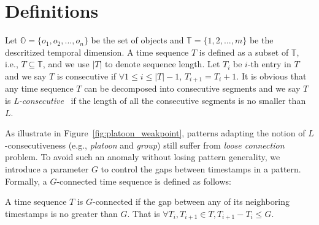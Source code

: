 \section{Definitions}
\label{sec:definition}
Let $\mathbb{O} = \{o_1 ,o_2,...,o_n\}$ be the set of objects and $\mathbb{T} =\{1,2,...,m\}$ be the descritized temporal dimension. A time sequence $T$ is defined as a subset of $\mathbb{T}$, i.e., $T \subseteq \mathbb{T}$, and we use $|T|$ to denote sequence length. Let $T_i$ be $i$-th entry in $T$ and we say $T$ is consecutive if $\forall 1\leq i\leq |T|-1$, $T_{i+1} = T_i + 1$. It is obvious that any time sequence $T$ can be decomposed into consecutive segments and we say $T$ is \textit{L-consecutive}~\cite{li2015platoon} if the length of all the consecutive segments is no smaller than $L$. 

As illustrate in Figure~\ref{fig:platoon_weakpoint}, patterns adapting the notion of $L$-consecutiveness (e.g., \emph{platoon} and \emph{group}) still suffer from \emph{loose connection} problem. 
To avoid such an anomaly without losing pattern generality, we introduce a parameter $G$ to control the gaps between
timestamps in a pattern. Formally, a $G$-connected time sequence is defined as follows:
%
%



\begin{definition}[$G$-connected]
A time sequence $T$ is $G$-connected if the gap between any of its neighboring timestamps is no greater than $G$. That is
 $\forall T_i,T_{i+1} \in T, T_{i+1}-T_{i} \leq G$.
\end{definition}

